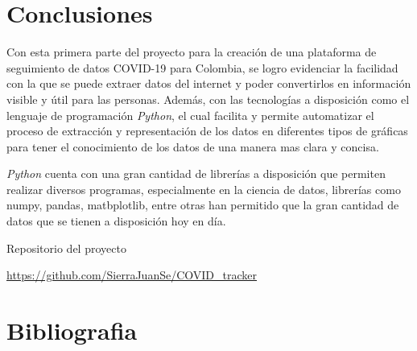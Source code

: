 \documentclass[conference,compsoc,onecolumn]{IEEEtran}
\begin{document}
\section{Conclusiones}
\label{sec:conclusions}
Con esta primera parte del proyecto para la creación de una plataforma de seguimiento de datos COVID-19 para Colombia, se logro evidenciar la facilidad con la que se puede extraer datos del internet y poder convertirlos en información visible y útil para las personas. Además, con las tecnologías a disposición como el lenguaje de programación \textit{Python}, el cual facilita y permite automatizar el proceso de extracción y representación de los datos en diferentes tipos de gráficas para tener el conocimiento de los datos de una manera mas clara y concisa.

\textit{Python} cuenta con una gran cantidad de librerías a disposición que permiten realizar diversos programas, especialmente  en la ciencia de datos, librerías como numpy, pandas, matbplotlib, entre otras han permitido que la gran cantidad de datos que se tienen a disposición hoy en día.

\singlespacing
Repositorio del proyecto

\url{https://github.com/SierraJuanSe/COVID_tracker}
\nocite{*}

\section{Bibliografia}
\label{sec:biblio}





\end{document}
